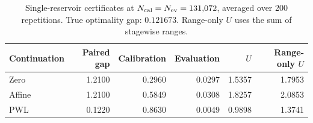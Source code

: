 \begin{table}[H]
\caption{Single-reservoir certificates at $N_{\rm cal}=N_{\rm ev}=131{,}072$, averaged over 200 repetitions. True optimality gap: $0.121673$. Range-only $U$ uses the sum of stagewise ranges.}
\label{tab:hydro-certificate}
\centering\small
\begin{tabular}{@{}lrrrrr@{}}
\toprule
Continuation & Paired gap & Calibration & Evaluation & $U$ & Range-only $U$\\
\midrule
Zero & 1.2100 & 0.2960 & 0.0297 & 1.5357 & 1.7953\\
Affine & 1.2100 & 0.5849 & 0.0308 & 1.8257 & 2.0853\\
PWL & 0.1220 & 0.8630 & 0.0049 & 0.9898 & 1.3741\\
\bottomrule
\end{tabular}
\end{table}
